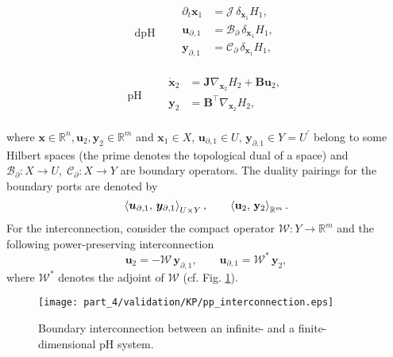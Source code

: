 \noindent
\begin{minipage}{.45\linewidth}
	\begin{equation}
	\text{dpH}\qquad
	\begin{aligned}
	\partial_t \bm{x}_1 &= \mathcal{J} \, \delta_{\bm{x}_1} {H_1}, \\
	\bm{u}_{\partial, 1}  &= \mathcal{B}_\partial \, \delta_{\bm{x}_1} {H_1}, \\
	\bm{y}_{\partial, 1} &= \mathcal{C}_\partial \, \delta_{\bm{x}_1} {H_1}, \\
	\end{aligned}
	\end{equation}
\end{minipage}
\begin{minipage}{.5\linewidth}
	\begin{equation}
	\text{pH} \qquad
	\begin{aligned}
	\dot{\mathbf{x}}_2 &= \mathbf{J} \nabla_{\mathbf{x}_2} {H_2} + \mathbf{B} \mathbf{u}_2, \\
	\mathbf{y}_{2} &= \mathbf{B}^\top \nabla_{\mathbf{x}_2} {H_2}, \\
	\end{aligned}
	\end{equation}
\end{minipage} %

where $\mathbf{x} \in \mathbb{R}^n, \mathbf{u}_2, \mathbf{y}_2 \in \mathbb{R}^m$ and $\bm{x}_1 \in {X}$,  $\bm{u}_{\partial, 1}  \in {U}, \, \bm{y}_{\partial, 1} \in  {Y} = {U}^\prime$ belong to some Hilbert spaces (the prime denotes the topological dual of a space)  and  $\mathcal{B}_\partial: {X} \rightarrow {U}, \; \mathcal{C}_\partial: {X} \rightarrow {Y}$ are boundary operators. The duality pairings for the boundary ports are denoted by
\[
\inner[{U} \times {Y}]{\bm{u}_{\partial, 1}}{\bm{y}_{\partial, 1}},  \qquad
\inner[\mathbb{R}^m]{\mathbf{u}_{2}}{\mathbf{y}_{2}}.
\]
For the interconnection, consider the compact operator $\mathcal{W}: Y \rightarrow \mathbb{R}^m$ and the following power-preserving interconnection
\begin{equation}
\label{eq:int_inf}
\mathbf{u}_2 = -\mathcal{W} \, \bm{y}_{\partial, 1},  \qquad \bm{u}_{\partial, 1} = \mathcal{W}^* \, \mathbf{y}_2,
\end{equation}
where $\mathcal{W}^*$ denotes the adjoint of $\mathcal{W}$ (cf. Fig. \ref{fig:interconnection_dpH_pH}). 
\begin{figure}[tb]
	\centering
	\texttt{[image: part\_4/validation/KP/pp\_interconnection.eps]} 
	\caption{Boundary interconnection between an infinite- and a finite-dimensional pH system.}
	\label{fig:interconnection_dpH_pH}
\end{figure}


